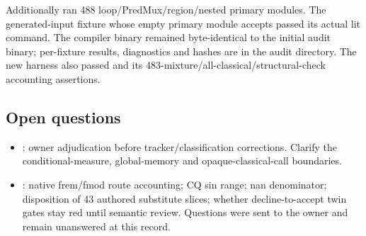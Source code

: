 Additionally ran 488 loop/PredMux/region/nested primary modules. The generated-input
fixture whose empty primary module accepts passed its actual lit command.
The compiler binary remained byte-identical to the initial audit binary;
per-fixture results, diagnostics and hashes are in the audit directory.
The new harness also passed  and its
483-mixture/all-classical/structural-check accounting assertions.

\subsection*{Open questions}
\begin{itemize}
  \item {}: owner adjudication before tracker/classification corrections.
    Clarify the conditional-measure, global-memory and opaque-classical-call boundaries.
  \item {}: native frem/fmod route accounting; CQ sin range; nan denominator;
    disposition of 43 authored substitute slices; whether decline-to-accept twin
    gates stay red until semantic review. Questions were sent to the owner and
    remain unanswered at this record.
\end{itemize}
